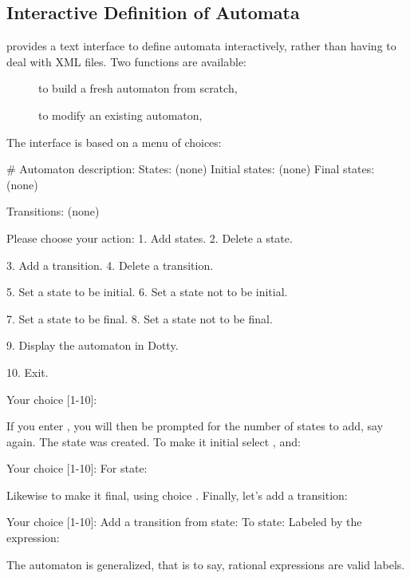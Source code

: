 \subsection{Interactive Definition of Automata}

\tafkit provides a text interface to define automata interactively,
rather than having to deal with XML files.  Two functions are
available:
\begin{description}
\item[] to build a fresh automaton from scratch,
\item[] to modify an existing automaton,
\end{description}

The interface is based on a menu of choices:
\begin{shell}
# 
Automaton description:
  States: (none)
  Initial states: (none)
  Final states: (none)

  Transitions: (none)

Please choose your action:
  1. Add states.
  2. Delete a state.

  3. Add a transition.
  4. Delete a transition.

  5. Set a state to be initial.
  6. Set a state not to be initial.

  7. Set a state to be final.
  8. Set a state not to be final.

  9. Display the automaton in Dotty.

  10. Exit.

Your choice [1-10]:  
\end{shell}

\noindent
If you enter , you will then be prompted for the number of
states to add, say  again.  The state  was created.  To
make it initial select , and:

\begin{shell}
Your choice [1-10]: 
  For state: 
\end{shell}

Likewise to make it final, using choice .  Finally, let's add a
transition:

\begin{shell}
Your choice [1-10]: 
  Add a transition from state: 
  To state: 
  Labeled by the expression: 
\end{shell}

\noindent
The automaton is generalized, that is to say, rational expressions are
valid labels.

